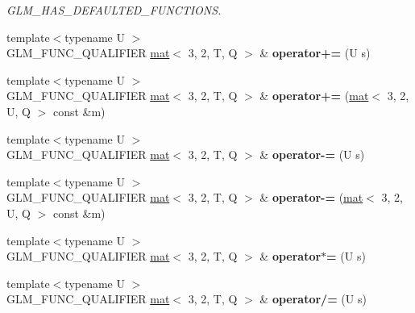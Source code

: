 \begin{DoxyCompactItemize}
\begin{DoxyCompactList}\small\item\em G\+L\+M\+\_\+\+H\+A\+S\+\_\+\+D\+E\+F\+A\+U\+L\+T\+E\+D\+\_\+\+F\+U\+N\+C\+T\+I\+O\+NS. \end{DoxyCompactList}\item 
\mbox{\label{structglm_1_1mat_3_013_00_012_00_01T_00_01Q_01_4_aa7657886e5ae9f21e9c2c5612d8b174f}} 
{\footnotesize template$<$typename U $>$ }\\G\+L\+M\+\_\+\+F\+U\+N\+C\+\_\+\+Q\+U\+A\+L\+I\+F\+I\+ER \hyperlink{structglm_1_1mat}{mat}$<$ 3, 2, T, Q $>$ \& {\bfseries operator+=} (U s)
\item 
\mbox{\label{structglm_1_1mat_3_013_00_012_00_01T_00_01Q_01_4_a5deb395c257fbf8d8ba3dc745fa85f44}} 
{\footnotesize template$<$typename U $>$ }\\G\+L\+M\+\_\+\+F\+U\+N\+C\+\_\+\+Q\+U\+A\+L\+I\+F\+I\+ER \hyperlink{structglm_1_1mat}{mat}$<$ 3, 2, T, Q $>$ \& {\bfseries operator+=} (\hyperlink{structglm_1_1mat}{mat}$<$ 3, 2, U, Q $>$ const \&m)
\item 
\mbox{\label{structglm_1_1mat_3_013_00_012_00_01T_00_01Q_01_4_a51cfb6b2048caf1fd49086f4f4d9ddb1}} 
{\footnotesize template$<$typename U $>$ }\\G\+L\+M\+\_\+\+F\+U\+N\+C\+\_\+\+Q\+U\+A\+L\+I\+F\+I\+ER \hyperlink{structglm_1_1mat}{mat}$<$ 3, 2, T, Q $>$ \& {\bfseries operator-\/=} (U s)
\item 
\mbox{\label{structglm_1_1mat_3_013_00_012_00_01T_00_01Q_01_4_a2145949a0575fb0b25217ea8d251da3c}} 
{\footnotesize template$<$typename U $>$ }\\G\+L\+M\+\_\+\+F\+U\+N\+C\+\_\+\+Q\+U\+A\+L\+I\+F\+I\+ER \hyperlink{structglm_1_1mat}{mat}$<$ 3, 2, T, Q $>$ \& {\bfseries operator-\/=} (\hyperlink{structglm_1_1mat}{mat}$<$ 3, 2, U, Q $>$ const \&m)
\item 
\mbox{\label{structglm_1_1mat_3_013_00_012_00_01T_00_01Q_01_4_af9e97ef690502d8ee8bf7f6d7ec91c9c}} 
{\footnotesize template$<$typename U $>$ }\\G\+L\+M\+\_\+\+F\+U\+N\+C\+\_\+\+Q\+U\+A\+L\+I\+F\+I\+ER \hyperlink{structglm_1_1mat}{mat}$<$ 3, 2, T, Q $>$ \& {\bfseries operator$\ast$=} (U s)
\item 
\mbox{\label{structglm_1_1mat_3_013_00_012_00_01T_00_01Q_01_4_a153c18b6262094cf8741f0e82173b2a4}} 
{\footnotesize template$<$typename U $>$ }\\G\+L\+M\+\_\+\+F\+U\+N\+C\+\_\+\+Q\+U\+A\+L\+I\+F\+I\+ER \hyperlink{structglm_1_1mat}{mat}$<$ 3, 2, T, Q $>$ \& {\bfseries operator/=} (U s)
\end{DoxyCompactItemize}
